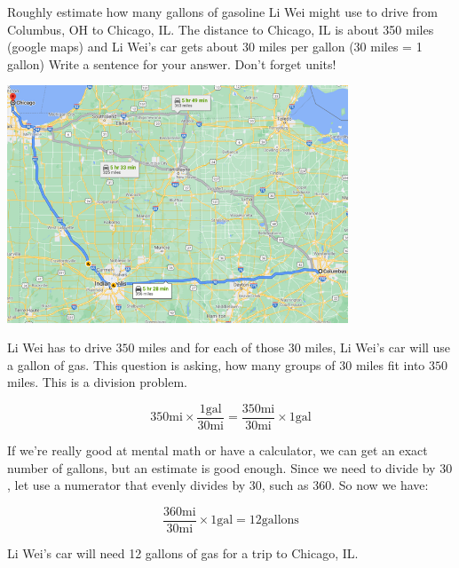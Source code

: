 \documentclass{ximera}
\begin{document}
\begin{example}
Roughly estimate how many gallons of gasoline Li Wei might use to drive from Columbus, OH to Chicago, IL. The distance to Chicago, IL is about 350 miles (google maps) and Li Wei's car gets about 30 miles per gallon (30 miles = 1 gallon) Write a sentence for your answer. Don't forget units!

\begin{image}
    \includegraphics[width=4in]{ColumbusChicago.png}
\end{image}

\begin{explanation}
Li Wei has to drive $350$ miles and for each of those $30$ miles, Li Wei's car will use a gallon of gas.  This question is asking, how many groups of $30$ miles fit into $350$ miles. This is a division problem. 

$$350 \text{mi} \times \frac{1 \text{gal}}{30 \text{mi}}=\frac{350 \text{mi}}{30 \text{mi}} \times{1 \text{gal}}  $$

If we're really good at mental math or have a calculator, we can get an exact number of gallons, but an estimate is good enough. Since we need to divide by $30$, let use a numerator that evenly divides by $30$, such as $360$. So now we have:

$$ \frac{360 \text{mi}}{30\text{mi}} \times{1 \text{gal}}= 12 \text{gallons}$$

Li Wei's car will need 12 gallons of gas for a trip to Chicago, IL.
\end{explanation}
\end{example}
\end{document}
